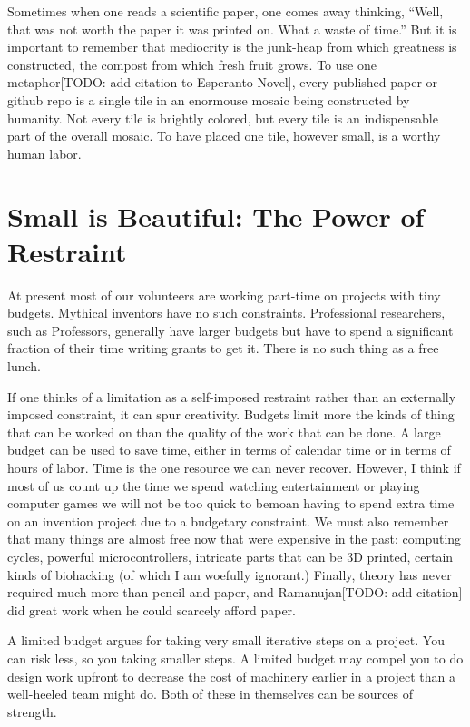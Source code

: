 \documentclass[
	fontsize=10pt, %
	twoside=false, %
	secnumdepth=1, %
]{kaobook}
\begin{document}
Sometimes when one reads a scientific paper, one comes away thinking, ``Well, that was not worth the paper it was printed on.
What a waste of time.'' But it is important to remember that mediocrity
is the junk-heap from which greatness is constructed, the compost from which fresh fruit grows.
To use one metaphor[TODO: add citation to Esperanto Novel], every published paper or github repo is a single tile
in an enormouse mosaic being constructed by humanity. Not every tile is brightly colored, but every tile is
an indispensable part of the overall mosaic.
To have placed one tile, however small, is a worthy human labor.

\section{Small is Beautiful: The Power of Restraint}

At present most of our volunteers are working part-time on projects
with tiny budgets.
Mythical inventors have no such constraints.
Professional researchers, such as Professors, generally have larger budgets
but have to spend a significant fraction of their time writing grants to get it.
There is no such thing as a free lunch.

If one thinks of a limitation as a self-imposed restraint rather than
an externally imposed constraint, it can spur creativity.  Budgets
limit more the kinds of thing that can be worked on than the quality
of the work that can be done.  A large budget can be used to save
time, either in terms of calendar time or in terms of hours of labor.
Time is the one resource we can never recover.  However, I think if
most of us count up the time we spend watching entertainment or
playing computer games we will not be too quick to bemoan having to
spend extra time on an invention project due to a budgetary
constraint.  We must also remember that many things are almost free
now that were expensive in the past: computing cycles, powerful
microcontrollers, intricate parts that can be 3D printed, certain
kinds of biohacking (of which I am woefully ignorant.)  Finally,
theory has never required much more than pencil and paper, and
Ramanujan[TODO: add citation] did great work when he could scarcely
afford paper.

A limited budget argues for taking very small iterative steps on a
project.  You can risk less, so you taking smaller steps.  A limited
budget may compel you to do design work upfront to decrease the cost
of machinery earlier in a project than a well-heeled team might do.
Both of these in themselves can be sources of strength.
\end{document}

